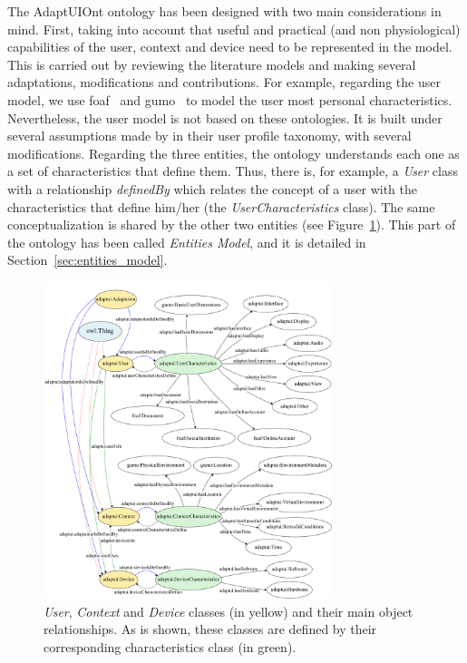 The AdaptUIOnt ontology has been designed with two main considerations in mind.
First, taking into account that useful and practical (and non physiological)
capabilities of the user, context and device need to be represented in the model.
This is carried out by reviewing the literature models and making several
adaptations, modifications and contributions. For example, regarding the user
model, we use \ac{foaf}~\citep{foaf} and \ac{gumo}~\citep{heckmann_gumogeneral_2005} to
model the user most personal characteristics. Nevertheless, the user model is
not based on these ontologies. It is built under several assumptions made by
\citet{casas_user_2008} in their user profile taxonomy, with several modifications.
Regarding the three entities, the ontology understands each one as a set of
characteristics that define them. Thus, there is, for example, a \textit{User}
class with a relationship \textit{definedBy} which relates the concept of a user
with the characteristics that define him/her (the \textit{UserCharacteristics}
class). The same conceptualization is shared by the other two entities (see
Figure~\ref{fig:entities_characteristics}). This part of the ontology has been
called \textit{Entities Model}, and it is detailed in Section~\ref{sec:entities_model}.



\begin{figure}
\centering
\includegraphics[width=0.75\textwidth]{../figures/PDF/entities_characteristics}
\caption{\textit{User},
\textit{Context} and \textit{Device} classes (in yellow) and their main object
relationships. As is shown, these classes are defined by their corresponding
characteristics class (in green).}
\label{fig:entities_characteristics}
\end{figure}


